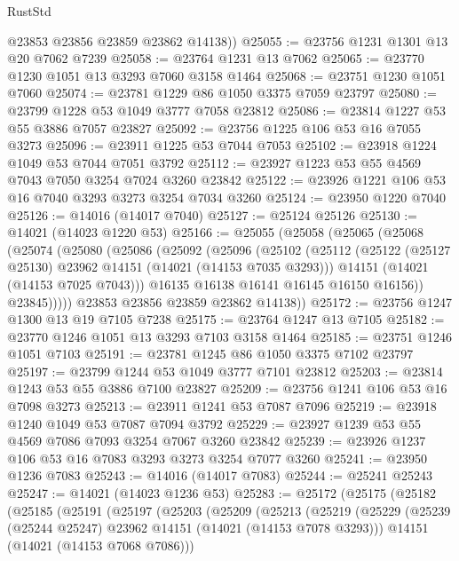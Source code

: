 \begin{lexlean}{RustStd}
\begin{coremodule}
        @23853
        @23856
        @23859
        @23862
        @14138))
@25055 := @23756 @1231 @1301 @13 @20 @7062 @7239
@25058 := @23764 @1231 @13 @7062
@25065 := @23770 @1230 @1051 @13 @3293 @7060 @3158 @1464
@25068 := @23751 @1230 @1051 @7060
@25074 := @23781 @1229 @86 @1050 @3375 @7059 @23797
@25080 := @23799 @1228 @53 @1049 @3777 @7058 @23812
@25086 := @23814 @1227 @53 @55 @3886 @7057 @23827
@25092 := @23756 @1225 @106 @53 @16 @7055 @3273
@25096 := @23911 @1225 @53 @7044 @7053
@25102 := @23918 @1224 @1049 @53 @7044 @7051 @3792
@25112 := @23927 @1223 @53 @55 @4569 @7043 @7050 @3254 @7024 @3260 @23842
@25122 := @23926 @1221 @106 @53 @16 @7040 @3293 @3273 @3254 @7034 @3260
@25124 := @23950 @1220 @7040
@25126 := @14016 (@14017 @7040)
@25127 := @25124 @25126
@25130 := @14021 (@14023 @1220 @53)
@25166 := @25055
    (@25058
      (@25065
        (@25068
          (@25074
            (@25080
              (@25086
                (@25092
                  (@25096
                    (@25102
                      (@25112
                        (@25122 (@25127 @25130) @23962 @14151 (@14021 (@14153 @7035 @3293)))
                        @14151
                        (@14021 (@14153 @7025 @7043)))
                      @16135
                      @16138
                      @16141
                      @16145
                      @16150
                      @16156))
                  @23845)))))
        @23853
        @23856
        @23859
        @23862
        @14138))
@25172 := @23756 @1247 @1300 @13 @19 @7105 @7238
@25175 := @23764 @1247 @13 @7105
@25182 := @23770 @1246 @1051 @13 @3293 @7103 @3158 @1464
@25185 := @23751 @1246 @1051 @7103
@25191 := @23781 @1245 @86 @1050 @3375 @7102 @23797
@25197 := @23799 @1244 @53 @1049 @3777 @7101 @23812
@25203 := @23814 @1243 @53 @55 @3886 @7100 @23827
@25209 := @23756 @1241 @106 @53 @16 @7098 @3273
@25213 := @23911 @1241 @53 @7087 @7096
@25219 := @23918 @1240 @1049 @53 @7087 @7094 @3792
@25229 := @23927 @1239 @53 @55 @4569 @7086 @7093 @3254 @7067 @3260 @23842
@25239 := @23926 @1237 @106 @53 @16 @7083 @3293 @3273 @3254 @7077 @3260
@25241 := @23950 @1236 @7083
@25243 := @14016 (@14017 @7083)
@25244 := @25241 @25243
@25247 := @14021 (@14023 @1236 @53)
@25283 := @25172
    (@25175
      (@25182
        (@25185
          (@25191
            (@25197
              (@25203
                (@25209
                  (@25213
                    (@25219
                      (@25229
                        (@25239 (@25244 @25247) @23962 @14151 (@14021 (@14153 @7078 @3293)))
                        @14151
                        (@14021 (@14153 @7068 @7086)))

\end{coremodule}
\end{lexlean}
